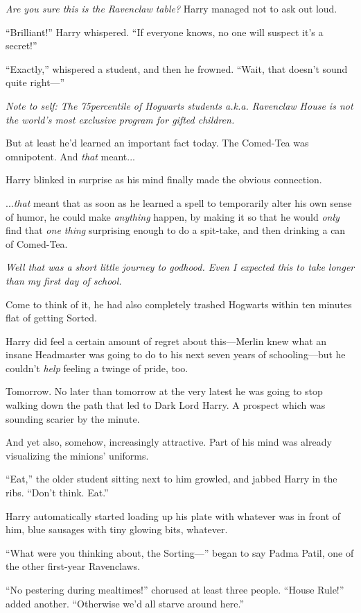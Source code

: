 \emph{Are you sure this is the Ravenclaw table?} Harry managed not to ask out loud.

“Brilliant!” Harry whispered. “If everyone knows, no one will suspect it’s a secret!”

“Exactly,” whispered a student, and then he frowned. “Wait, that doesn’t sound quite right—”

\emph{Note to self: The 75\Th percentile of Hogwarts students a.k.a. Ravenclaw House is not the world’s most exclusive program for gifted children.}

But at least he’d learned an important fact today. The Comed-Tea was omnipotent. And \emph{that} meant...

Harry blinked in surprise as his mind finally made the obvious connection.

...\emph{that} meant that as soon as he learned a spell to temporarily alter his own sense of humor, he could make \emph{anything} happen, by making it so that he would \emph{only} find that \emph{one thing} surprising enough to do a spit-take, and then drinking a can of Comed-Tea.

\emph{Well that was a short little journey to godhood. Even I expected this to take longer than my first day of school.}

Come to think of it, he had also completely trashed Hogwarts within ten minutes flat of getting Sorted.

Harry did feel a certain amount of regret about this—Merlin knew what an insane Headmaster was going to do to his next seven years of schooling—but he couldn’t \emph{help} feeling a twinge of pride, too.

Tomorrow. No later than tomorrow at the very latest he was going to stop walking down the path that led to Dark Lord Harry. A prospect which was sounding scarier by the minute.

And yet also, somehow, increasingly attractive. Part of his mind was already visualizing the minions’ uniforms.

“Eat,” the older student sitting next to him growled, and jabbed Harry in the ribs. “Don’t think. Eat.”

Harry automatically started loading up his plate with whatever was in front of him, blue sausages with tiny glowing bits, whatever.

“What were you thinking about, the Sorting—” began to say Padma Patil, one of the other first-year Ravenclaws.

“No pestering during mealtimes!” chorused at least three people. “House Rule!” added another. “Otherwise we’d all starve around here.”

